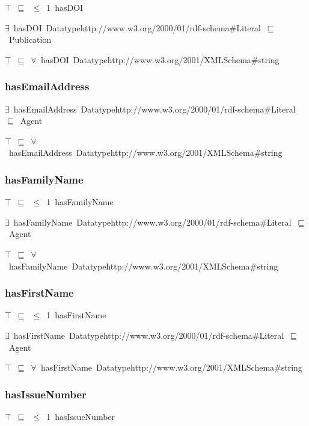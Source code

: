 \documentclass{article}
\begin{document}
\ensuremath{\top}~\ensuremath{\sqsubseteq}~\ensuremath{\leq}~1~hasDOI

\ensuremath{\exists}~hasDOI~Datatypehttp://www.w3.org/2000/01/rdf-schema#Literal~\ensuremath{\sqsubseteq}~Publication

\ensuremath{\top}~\ensuremath{\sqsubseteq}~\ensuremath{\forall}~hasDOI~Datatypehttp://www.w3.org/2001/XMLSchema#string

\subsubsection*{hasEmailAddress}

\ensuremath{\exists}~hasEmailAddress~Datatypehttp://www.w3.org/2000/01/rdf-schema#Literal~\ensuremath{\sqsubseteq}~Agent

\ensuremath{\top}~\ensuremath{\sqsubseteq}~\ensuremath{\forall}~hasEmailAddress~Datatypehttp://www.w3.org/2001/XMLSchema#string

\subsubsection*{hasFamilyName}

\ensuremath{\top}~\ensuremath{\sqsubseteq}~\ensuremath{\leq}~1~hasFamilyName

\ensuremath{\exists}~hasFamilyName~Datatypehttp://www.w3.org/2000/01/rdf-schema#Literal~\ensuremath{\sqsubseteq}~Agent

\ensuremath{\top}~\ensuremath{\sqsubseteq}~\ensuremath{\forall}~hasFamilyName~Datatypehttp://www.w3.org/2001/XMLSchema#string

\subsubsection*{hasFirstName}

\ensuremath{\top}~\ensuremath{\sqsubseteq}~\ensuremath{\leq}~1~hasFirstName

\ensuremath{\exists}~hasFirstName~Datatypehttp://www.w3.org/2000/01/rdf-schema#Literal~\ensuremath{\sqsubseteq}~Agent

\ensuremath{\top}~\ensuremath{\sqsubseteq}~\ensuremath{\forall}~hasFirstName~Datatypehttp://www.w3.org/2001/XMLSchema#string

\subsubsection*{hasIssueNumber}

\ensuremath{\top}~\ensuremath{\sqsubseteq}~\ensuremath{\leq}~1~hasIssueNumber
\end{document}
